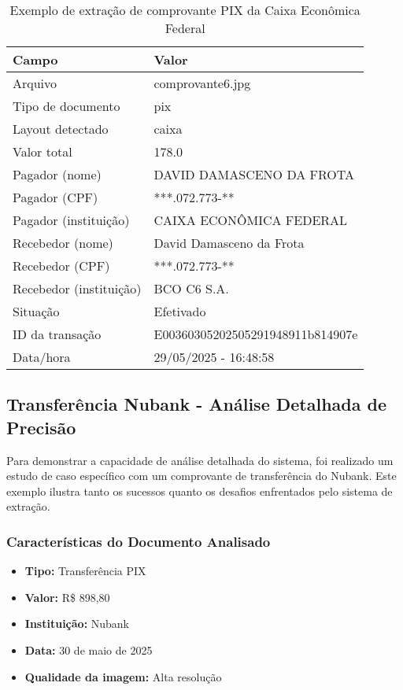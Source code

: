 \begin{table}[H]
\centering
\caption{Exemplo de extração de comprovante PIX da Caixa Econômica Federal}
\label{tab:exemplo-pix}
\begin{tabular}{|l|l|}
\hline
\textbf{Campo}         & \textbf{Valor} \\ \hline
Arquivo                & comprovante6.jpg \\ \hline
Tipo de documento      & pix \\ \hline
Layout detectado       & caixa \\ \hline
Valor total            & 178.0 \\ \hline
Pagador (nome)         & DAVID DAMASCENO DA FROTA \\ \hline
Pagador (CPF)          & ***.072.773-** \\ \hline
Pagador (instituição)  & CAIXA ECONÔMICA FEDERAL \\ \hline
Recebedor (nome)       & David Damasceno da Frota \\ \hline
Recebedor (CPF)        & ***.072.773-** \\ \hline
Recebedor (instituição)& BCO C6 S.A. \\ \hline
Situação               & Efetivado \\ \hline
ID da transação        & E00360305202505291948911b814907e \\ \hline
Data/hora              & 29/05/2025 - 16:48:58 \\ \hline
\end{tabular}
\end{table}

\subsection{Transferência Nubank - Análise Detalhada de Precisão}

Para demonstrar a capacidade de análise detalhada do sistema, foi realizado um estudo de caso específico com um comprovante de transferência do Nubank. Este exemplo ilustra tanto os sucessos quanto os desafios enfrentados pelo sistema de extração.

\subsubsection{Características do Documento Analisado}

\begin{itemize}
    \item \textbf{Tipo:} Transferência PIX
    \item \textbf{Valor:} R\$ 898,80
    \item \textbf{Instituição:} Nubank
    \item \textbf{Data:} 30 de maio de 2025
    \item \textbf{Qualidade da imagem:} Alta resolução
\end{itemize}


